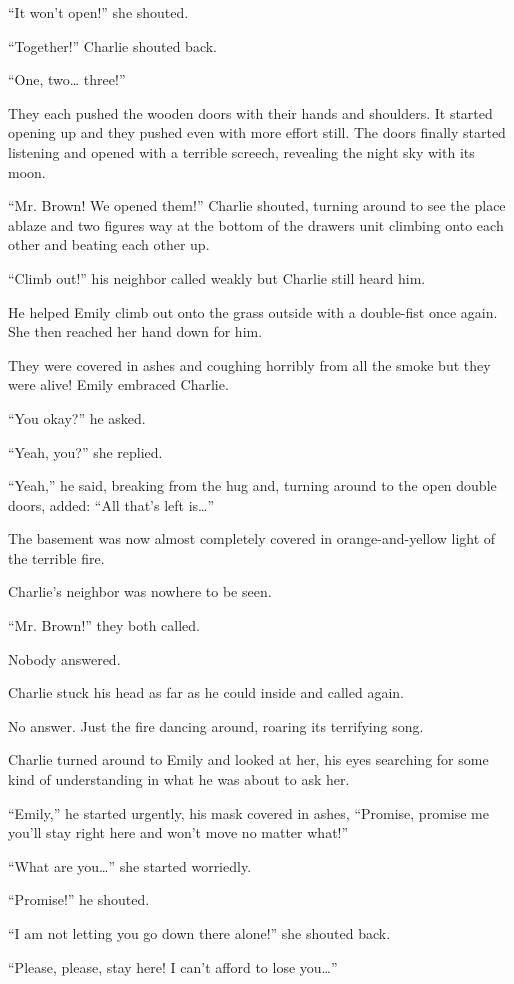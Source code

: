 “It won't open!” she shouted.

“Together!” Charlie shouted back.

“One, two… three!”

They each pushed the wooden doors with their hands and shoulders. It started opening up and they pushed even with more effort still. The doors finally started listening and opened with a terrible screech, revealing the night sky with its moon.

“Mr. Brown! We opened them!” Charlie shouted, turning around to see the place ablaze and two figures way at the bottom of the drawers unit climbing onto each other and beating each other up.

“Climb out!” his neighbor called weakly but Charlie still heard him.

He helped Emily climb out onto the grass outside with a double-fist once again. She then reached her hand down for him.

They were covered in ashes and coughing horribly from all the smoke but they were alive! Emily embraced Charlie.

“You okay?” he asked.

“Yeah, you?” she replied.

“Yeah,” he said, breaking from the hug and, turning around to the open double doors, added: “All that's left is…”

The basement was now almost completely covered in orange-and-yellow light of the terrible fire.

Charlie's neighbor was nowhere to be seen.

“Mr. Brown!” they both called.

Nobody answered.

Charlie stuck his head as far as he could inside and called again.

No answer. Just the fire dancing around, roaring its terrifying song.

Charlie turned around to Emily and looked at her, his eyes searching for some kind of understanding in what he was about to ask her.

“Emily,” he started urgently, his mask covered in ashes, “Promise, promise me you'll stay right here and won't move no matter what!”

“What are you…” she started worriedly.

“Promise!” he shouted.

“I am not letting you go down there alone!” she shouted back.

“Please, please, stay here! I can't afford to lose you…”

